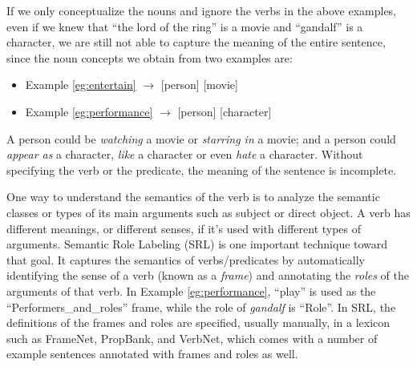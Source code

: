 If we only conceptualize the nouns and ignore the verbs in the above examples,
even if we knew that ``the lord of the ring'' is a movie and
``gandalf'' is a character, we are still not able to capture the meaning
of the entire sentence, since the noun concepts we obtain from two examples are:
\begin{itemize}
\item Example \ref{eg:entertain} $\longrightarrow$ [person] [movie]
\item Example \ref{eg:performance} $\longrightarrow$ [person] [character]
\end{itemize}
A person could be {\em watching} a movie or {\em starring in} a movie;
and a person could {\em appear as} a character, {\em like} a character or
even {\em hate} a character. Without specifying the verb or the predicate,
the meaning of the sentence is incomplete.

One way to understand the semantics of
the verb is to analyze the semantic classes or types of its main arguments
such as subject or direct object. A verb has different meanings, or different
senses, if it's used with different types of arguments.
%
Semantic Role Labeling (SRL) is one important technique toward that goal.
It captures the semantics of verbs/predicates by automatically identifying
the sense of a verb (known as a {\em frame}) and
annotating the {\em roles} of the arguments of that verb.
In Example \ref{eg:performance},
``play'' is used as the ``Performers\_and\_roles'' frame, while the
role of {\em gandalf} is ``Role''. In SRL, the definitions of the frames
and roles are specified, usually manually, in a lexicon such as
FrameNet\cite{baker1998berkeley},
PropBank\cite{kingsbury2002treebank}, and VerbNet\cite{KipperDP00},
which comes with
a number of example sentences annotated with frames and roles as well.

